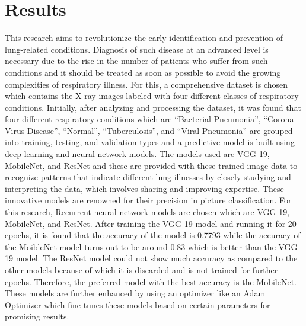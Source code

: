 \chapter{Results}
\label{ch:results}
This research aims to revolutionize the early identification and prevention of lung-related conditions. Diagnosis of such disease at an advanced level is necessary due to the rise in the number of patients who suffer from such conditions and it should be treated as soon as possible to avoid the growing complexities of respiratory illness. For this, a comprehensive dataset is chosen which contains the X-ray images labeled with four different classes of respiratory conditions. Initially, after analyzing and processing the dataset, it was found that four different respiratory conditions which are “Bacterial Pneumonia”, “Corona Virus Disease”, “Normal”, “Tuberculosis”, and “Viral Pneumonia” are grouped into training, testing, and validation types and a predictive model is built using deep learning and neural network models. The models used are VGG 19, MobileNet, and ResNet and these are provided with these trained image data to recognize patterns that indicate different lung illnesses by closely studying and interpreting the data, which involves sharing and improving expertise. These innovative models are renowned for their precision in picture classification. For this research, Recurrent neural network models are chosen which are VGG 19, MobileNet, and ResNet. After training the VGG 19 model and running it for 20 epochs, it is found that the accuracy of the model is 0.7793 while the accuracy of the MoibleNet model turns out to be around 0.83 which is better than the VGG 19 model. The ResNet model could not show much accuracy as compared to the other models because of which it is discarded and is not trained for further epochs. Therefore, the preferred model with the best accuracy is the MobileNet. These models are further enhanced by using an optimizer like an Adam Optimizer which fine-tunes these models based on certain parameters for promising results.









